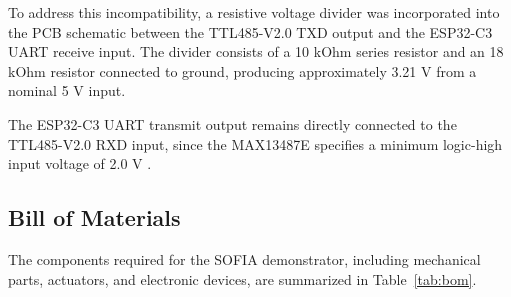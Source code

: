 \documentclass[lettersize,journal]{IEEEtran}
\begin{document}
	To address this incompatibility, a resistive voltage
	divider was incorporated into the PCB schematic between
	the TTL485-V2.0 TXD output and the ESP32-C3 UART receive
	input. The divider consists of a 10 kOhm series resistor
	and an 18 kOhm resistor connected to ground, producing
	approximately 3.21 V from a nominal 5 V input.
	
	The ESP32-C3 UART transmit output remains directly
	connected to the TTL485-V2.0 RXD input, since the
	MAX13487E specifies a minimum logic-high input voltage
	of 2.0 V \cite{max13487e}.
	
	
	\subsection{Bill of Materials}
	The components required for the SOFIA demonstrator,
	including mechanical parts, actuators, and electronic
	devices, are summarized in Table~\ref{tab:bom}.
	
\end{document}
